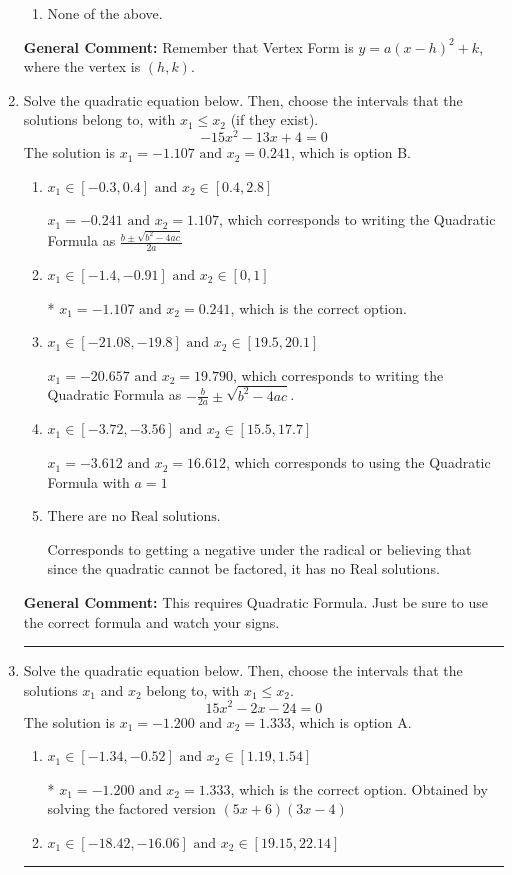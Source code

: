 \documentclass{extbook}[14pt]
\newcommand{\litem}[1]{\item #1

\rule{\textwidth}{0.4pt}}
\begin{document}
\begin{enumerate}
{\begin{enumerate}[label=\Alph*.]
\begin{multicols}{2}
\end{multicols}\item None of the above.\end{enumerate}
\textbf{General Comment:} Remember that Vertex Form is $y = a(x-h)^2+k$, where the vertex is $(h, k)$.
}
\litem{
Solve the quadratic equation below. Then, choose the intervals that the solutions belong to, with $x_1 \leq x_2$ (if they exist).
\[ -15x^{2} -13 x + 4 = 0 \]The solution is \( x_1 = -1.107 \text{ and } x_2 = 0.241 \), which is option B.\begin{enumerate}[label=\Alph*.]
\item \( x_1 \in [-0.3, 0.4] \text{ and } x_2 \in [0.4, 2.8] \)

 $x_1 = -0.241 \text{ and } x_2 = 1.107$, which corresponds to writing the Quadratic Formula as $\frac{b \pm \sqrt{b^2 - 4ac}}{2a}$
\item \( x_1 \in [-1.4, -0.91] \text{ and } x_2 \in [0, 1] \)

* $x_1 = -1.107 \text{ and } x_2 = 0.241$, which is the correct option.
\item \( x_1 \in [-21.08, -19.8] \text{ and } x_2 \in [19.5, 20.1] \)

 $x_1 = -20.657 \text{ and } x_2 = 19.790$, which corresponds to writing the Quadratic Formula as $-\frac{b}{2a} \pm \sqrt{b^2 - 4ac}$.
\item \( x_1 \in [-3.72, -3.56] \text{ and } x_2 \in [15.5, 17.7] \)

 $x_1 = -3.612 \text{ and } x_2 = 16.612$, which corresponds to using the Quadratic Formula with $a=1$
\item \( \text{There are no Real solutions.} \)

Corresponds to getting a negative under the radical or believing that since the quadratic cannot be factored, it has no Real solutions.
\end{enumerate}

\textbf{General Comment:} This requires Quadratic Formula. Just be sure to use the correct formula and watch your signs.
}
\litem{
Solve the quadratic equation below. Then, choose the intervals that the solutions $x_1$ and $x_2$ belong to, with $x_1 \leq x_2$.
\[ 15x^{2} -2 x -24 = 0 \]The solution is \( x_1 = -1.200 \text{ and } x_2 = 1.333 \), which is option A.\begin{enumerate}[label=\Alph*.]
\item \( x_1 \in [-1.34, -0.52] \text{ and } x_2 \in [1.19, 1.54] \)

* $x_1 = -1.200 \text{ and } x_2 = 1.333$, which is the correct option. Obtained by solving the factored version $(5x + 6)(3x -4)$
\item \( x_1 \in [-18.42, -16.06] \text{ and } x_2 \in [19.15, 22.14] \)


\end{enumerate}}
\end{enumerate}
\end{document}
